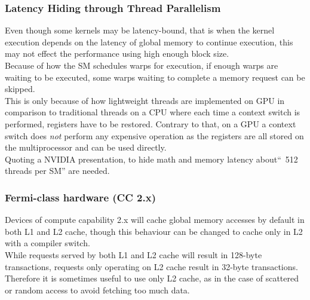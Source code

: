 \subsubsection{Latency Hiding through Thread Parallelism}
Even though some kernels may be latency-bound,
that is when the kernel execution depends on the latency of global memory to continue execution,
this may not effect the performance using high enough block size.\\
Because of how the SM schedules warps for execution,
if enough warps are waiting to be executed, some warps waiting to complete a memory request can be skipped.\\
This is only because of how lightweight threads are implemented on GPU in comparison to traditional threads on a CPU where each time a context switch is performed, registers have to be restored.
Contrary to that, on a GPU a context switch does \emph{not} perform any expensive operation as the registers are all stored on the multiprocessor and can be used directly.\\
Quoting a NVIDIA presentation, to hide math and memory latency about``~512 threads per SM'' \cite{sc11_perf_optimization} are needed.\\
\subsubsection{Fermi-class hardware (CC 2.x)}
Devices of compute capability 2.x will cache global memory accesses by default in both L1 and L2 cache,
though this behaviour can be changed to cache only in L2 with a compiler switch.\\
While requests served by both L1 and L2 cache will result in 128-byte transactions, requests only operating on L2 cache result in 32-byte transactions.\\
Therefore it is sometimes useful to use only L2 cache, as in the case of scattered or random access to avoid fetching too much data.\\


